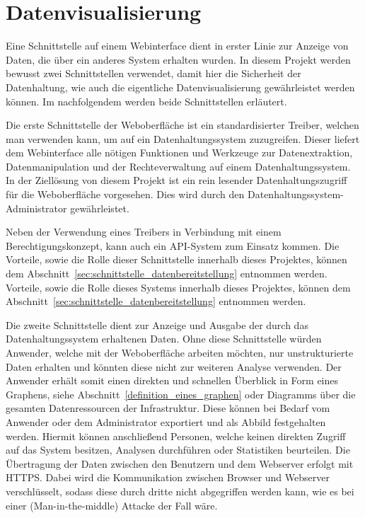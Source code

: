 {\section{Datenvisualisierung}
Eine Schnittstelle auf einem Webinterface dient in erster Linie zur Anzeige von
Daten, die über ein anderes System erhalten wurden. In diesem Projekt werden
bewusst zwei Schnittstellen verwendet, damit hier die Sicherheit der
Datenhaltung, wie auch die eigentliche Datenvisualisierung gewährleistet werden
können. Im nachfolgendem werden beide Schnittstellen erläutert.

Die erste Schnittstelle der Weboberfläche ist ein standardisierter Treiber,
welchen man verwenden kann, um auf ein Datenhaltungssystem zuzugreifen. Dieser
liefert dem Webinterface alle nötigen Funktionen und Werkzeuge zur
Datenextraktion, Datenmanipulation und der Rechteverwaltung auf einem
Datenhaltungssystem. In der Ziellösung von diesem Projekt ist ein rein lesender
Datenhaltungszugriff für die Weboberfläche vorgesehen. Dies wird durch den
Datenhaltungssystem\hyp{}Administrator gewährleistet.

Neben der Verwendung eines Treibers in Verbindung mit einem
Berechtigungskonzept, kann auch ein API\hyp{}System zum Einsatz kommen. Die
Vorteile, sowie die Rolle dieser Schnittstelle innerhalb dieses Projektes,
können dem Abschnitt~\ref{sec:schnittstelle_datenbereitstellung} entnommen
werden.
Vorteile, sowie die Rolle dieses Systems innerhalb dieses Projektes, können dem
Abschnitt~\ref{sec:schnittstelle_datenbereitstellung} entnommen werden.

Die zweite Schnittstelle dient zur Anzeige und Ausgabe der durch das
Datenhaltungssystem erhaltenen Daten. Ohne diese Schnittstelle würden Anwender,
welche mit der Weboberfläche arbeiten möchten, nur unstrukturierte Daten
erhalten und könnten diese nicht zur weiteren Analyse verwenden. Der Anwender
erhält somit einen direkten und schnellen Überblick in Form eines Graphens,
siehe Abschnitt~\ref{definition_eines_graphen} oder
Diagramms über die gesamten Datenressourcen der Infrastruktur. Diese können bei
Bedarf vom Anwender oder dem Administrator exportiert und als Abbild
festgehalten werden. Hiermit können anschließend Personen, welche keinen
direkten Zugriff auf das System besitzen, Analysen durchführen oder Statistiken
beurteilen. Die Übertragung der Daten zwischen den Benutzern und dem Webserver
erfolgt mit \gls{HTTPS}. Dabei wird die Kommunikation zwischen Browser und
Webserver verschlüsselt, sodass diese durch dritte nicht abgegriffen werden
kann, wie es bei einer (Man-in-the-middle) Attacke der Fall wäre.
\mr%

}
